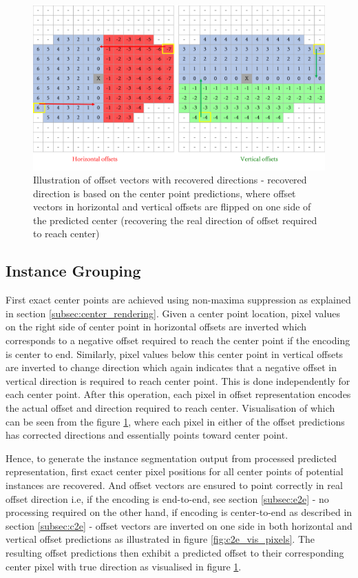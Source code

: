 \begin{figure}[!ht]
    \includegraphics[width = \textwidth]{Graphics/Methodology/extra_offsets.pdf}
    \caption[Offset Vectors with Recovered Direction]{Illustration of offset vectors with recovered directions - recovered direction is based on the center point predictions, where offset vectors in horizontal and vertical offsets are flipped on one side of the predicted center (recovering the real direction of offset required to reach center)}
    \label{fig:offsets_pixels_recovered}
\end{figure}

\subsection{Instance Grouping}
\label{subsec:regression_approach}

First exact center points are achieved using non-maxima suppression as explained in section \ref{subsec:center_rendering}. Given a center point location, pixel values on the right side of center point in horizontal offsets are inverted which corresponds to a negative offset required to reach the center point if the encoding is center to end. Similarly, pixel values below this center point in vertical offsets are inverted to change direction which again indicates that a negative offset in vertical direction is required to reach center point. This is done independently for each center point. After this operation, each pixel in offset representation encodes the actual offset and direction required to reach center. Visualisation of which can be seen from the figure \ref{fig:offsets_pixels_recovered}, where each pixel in either of the offset predictions has corrected directions and essentially points toward center point.


Hence, to generate the instance segmentation output from processed predicted representation, first exact center pixel positions for all center points of potential instances are recovered. And offset vectors are ensured to point correctly in real offset direction i.e, if the encoding is end-to-end, see section \ref{subsec:e2e} - no processing required on the other hand, if encoding is center-to-end as described in section \ref{subsec:c2e} - offset vectors are inverted on one side in both horizontal and vertical offset predictions as illustrated  in figure \ref{fig:c2e_vis_pixels}. The resulting offset predictions then exhibit a predicted offset to their corresponding center pixel with true direction as visualised in figure \ref{fig:offsets_pixels_recovered}.  


